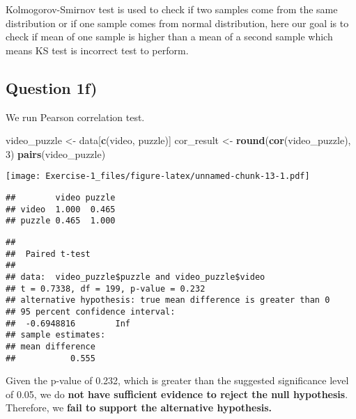 \documentclass[
]{article}
\newenvironment{Shaded}{\begin{snugshade}}{\end{snugshade}}
\newcommand{\AttributeTok}[1]{\textcolor[rgb]{0.13,0.29,0.53}{#1}}
\newcommand{\ConstantTok}[1]{\textcolor[rgb]{0.56,0.35,0.01}{#1}}
\newcommand{\DecValTok}[1]{\textcolor[rgb]{0.00,0.00,0.81}{#1}}
\newcommand{\FunctionTok}[1]{\textcolor[rgb]{0.13,0.29,0.53}{\textbf{#1}}}
\newcommand{\NormalTok}[1]{#1}
\newcommand{\OtherTok}[1]{\textcolor[rgb]{0.56,0.35,0.01}{#1}}
\newcommand{\SpecialCharTok}[1]{\textcolor[rgb]{0.81,0.36,0.00}{\textbf{#1}}}
\newcommand{\StringTok}[1]{\textcolor[rgb]{0.31,0.60,0.02}{#1}}
\begin{document}
Kolmogorov-Smirnov test is used to check if two samples come from the
same distribution or if one sample comes from normal distribution, here
our goal is to check if mean of one sample is higher than a mean of a
second sample which means KS test is incorrect test to perform.

\hypertarget{question-1f}{%
\subsection{Question 1f)}\label{question-1f}}

We run Pearson correlation test.

\begin{Shaded}
\begin{Highlighting}[]
\NormalTok{video\_puzzle }\OtherTok{\textless{}{-}}\NormalTok{ data[}\FunctionTok{c}\NormalTok{(}\StringTok{\textquotesingle{}video\textquotesingle{}}\NormalTok{, }\StringTok{\textquotesingle{}puzzle\textquotesingle{}}\NormalTok{)]}
\NormalTok{cor\_result }\OtherTok{\textless{}{-}} \FunctionTok{round}\NormalTok{(}\FunctionTok{cor}\NormalTok{(video\_puzzle), }\DecValTok{3}\NormalTok{)}
\FunctionTok{pairs}\NormalTok{(video\_puzzle)}
\end{Highlighting}
\end{Shaded}

\texttt{[image: Exercise-1\_files/figure-latex/unnamed-chunk-13-1.pdf]}

\begin{Shaded}
\end{Shaded}

\begin{verbatim}
##        video puzzle
## video  1.000  0.465
## puzzle 0.465  1.000
\end{verbatim}

\begin{verbatim}
## 
##  Paired t-test
## 
## data:  video_puzzle$puzzle and video_puzzle$video
## t = 0.7338, df = 199, p-value = 0.232
## alternative hypothesis: true mean difference is greater than 0
## 95 percent confidence interval:
##  -0.6948816        Inf
## sample estimates:
## mean difference 
##           0.555
\end{verbatim}

Given the p-value of 0.232, which is greater than the suggested
significance level of 0.05, we do \textbf{not have sufficient evidence
to reject the null hypothesis}. Therefore, we \textbf{fail to support
the alternative hypothesis.}
\end{document}
